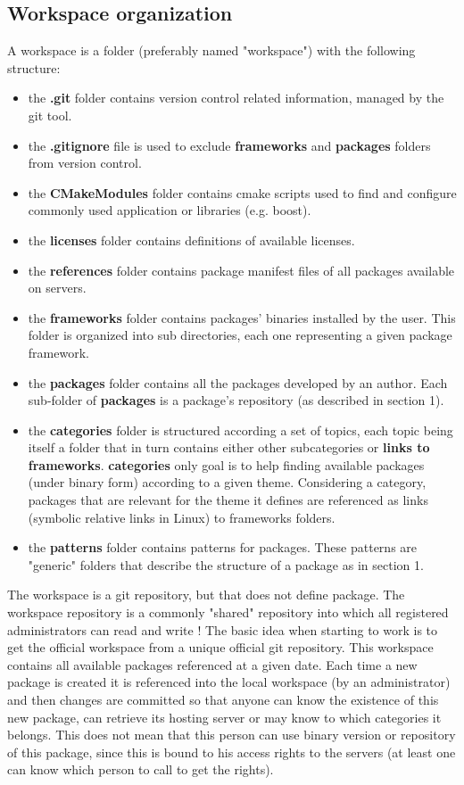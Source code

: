 \documentclass[12pt,a4paper]{article}
\begin{document}
\subsection{Workspace organization}

A workspace is a folder (preferably named "workspace") with the following structure:
\begin{itemize}
\item the \textbf{.git} folder contains version control related information, managed by the git tool.
\item the \textbf{.gitignore} file is used to exclude  \textbf{frameworks} and \textbf{packages} folders from version control.
\item the \textbf{CMakeModules} folder contains cmake scripts used to find and configure commonly used application or libraries (e.g. boost).
\item the \textbf{licenses} folder contains definitions of available licenses.
\item the \textbf{references} folder contains package manifest files of all packages available on servers.
\item the \textbf{frameworks} folder contains packages' binaries installed by the user. This folder is organized into sub directories, each one representing a given package framework.
\item the \textbf{packages} folder contains all the packages developed by an author. Each sub-folder of \textbf{packages} is a package's repository (as described in section 1).
\item the \textbf{categories} folder is structured according a set of topics, each topic being itself a folder that in turn contains either other subcategories or \textbf{links to frameworks}. \textbf{categories} only goal is to help finding available packages (under binary form) according to a given theme. Considering a category, packages that are relevant for the theme it defines are referenced as links (symbolic relative links in Linux) to frameworks folders.
\item the \textbf{patterns} folder contains patterns for packages. These patterns are "generic" folders that describe the structure of a package as in section 1.
\end{itemize}

The workspace is a git repository, but that does not define package. The workspace repository is a commonly "shared" repository into which all registered administrators can read and write ! The basic idea when starting to work is to get the official workspace from a unique official git repository. This workspace contains all available packages referenced at a given date. Each time a new package is created it is referenced into the local workspace (by an administrator) and then changes are committed so that anyone can know the existence of this new package, can retrieve its hosting server or may know to which categories it belongs. This does not mean that this person can use binary version or repository of this package, since this is bound to his access rights to the servers (at least one can know which person to call to get the rights).
\end{document}
